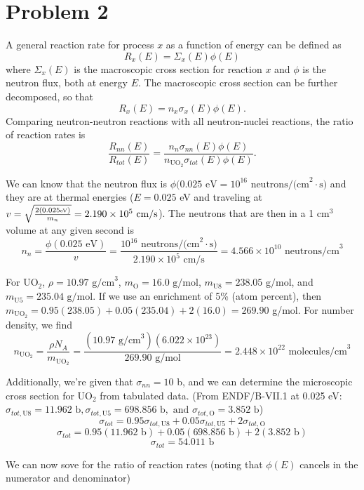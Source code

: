\documentclass{article}
\begin{document}
\newpage

\section*{Problem 2}

A general reaction rate for process $x$ as a function of energy can be defined as 
$$ R_x(E) = \Sigma_x(E) \phi(E) $$
where $\Sigma_x(E)$ is the macroscopic cross section for reaction $x$ and $\phi$ is the neutron flux, both at energy $E$. The macroscopic cross section can be further decomposed, so that
$$ R_x(E) = n_x \sigma_x(E) \phi(E) .$$
Comparing neutron-neutron reactions with all neutron-nuclei reactions, the ratio of reaction rates is
$$ \frac{R_{nn}(E)}{R_{tot}(E)} = \frac{n_n \sigma_{nn}(E) \phi(E)}{n_{\text{UO}_2} \sigma_{tot}(E) \phi(E)} .$$

We can know that the neutron flux is $\phi(0.025\text{ eV} = 10^{16}\text{ neutrons/(cm}^2\cdot\text{s)}$ and they are at thermal energies ($E = 0.025$ eV and traveling at $v = \sqrt{\frac{2(0.025\text{\tiny eV})}{m_n}} = 2.190\times10^5\text{ cm/s}$). The neutrons that are then in a 1 cm$^3$ volume at any given second is
$$ n_n = \frac{\phi(0.025\text{ eV})}{v} = \frac{10^{16}\text{ neutrons/(cm}^2\cdot\text{s)}}{2.190\times10^5\text{ cm/s}} = 4.566\times10^{10}\text{ neutrons/cm}^3 $$

For UO$_2$, $\rho = 10.97\text{ g/cm}^3$, $m_{\text{O}} = 16.0\text{ g/mol}$, $m_{\text{U}8} = 238.05\text{ g/mol}$, and $m_{\text{U}5} = 235.04\text{ g/mol}$. If we use an enrichment of 5\% (atom percent), then $m_{\text{UO}_2} = 0.95(238.05) + 0.05(235.04) + 2(16.0) = 269.90$ g/mol. For number density, we find
$$ n_{\text{UO}_2} = \frac{\rho N_A}{m_{\text{UO}_2}} = \frac{(10.97\text{ g/cm}^3)(6.022\times10^{23})}{269.90\text{ g/mol}} = 2.448\times10^{22}\text{ molecules/cm}^3$$

Additionally, we're given that $\sigma_{nn} = 10$ b, and we can determine the microscopic cross section for UO$_2$ from tabulated data. (From ENDF/B-VII.1 at 0.025 eV: $\sigma_{tot,\text{U}8} = 11.962\text{ b},\sigma_{tot,\text{U}5} = 698.856\text{ b}, \text{ and } \sigma_{tot,\text{O}} = 3.852\text{ b}$)
$$ \sigma_{tot} = 0.95\sigma_{tot,\text{U}8} + 0.05\sigma_{tot,\text{U}5} + 2\sigma_{tot,\text{O}} $$
$$ \sigma_{tot} = 0.95(11.962\text{ b}) + 0.05(698.856\text{ b}) + 2(3.852\text{ b}) $$
$$ \sigma_{tot} = 54.011\text{ b} $$

We can now sove for the ratio of reaction rates (noting that $\phi(E)$ cancels in the numerator and denominator)
\end{document}
